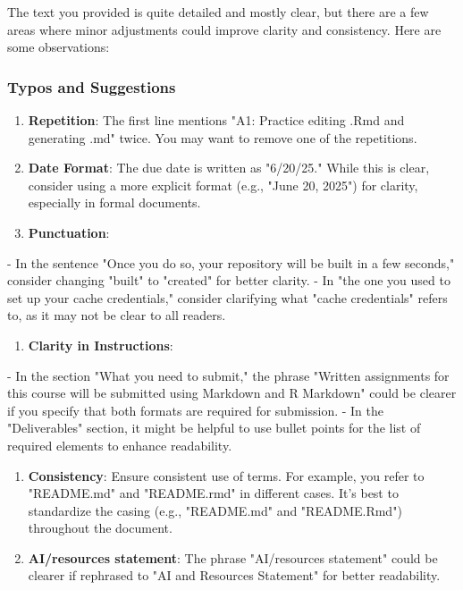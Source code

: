 \begin{botresponse}

The text you provided is quite detailed and mostly clear, but there are a few areas where minor adjustments could improve clarity and consistency. Here are some observations:

\subsubsection{Typos and Suggestions}

\begin{enumerate}
\item \textbf{Repetition}: The first line mentions "A1: Practice editing .Rmd and generating .md" twice. You may want to remove one of the repetitions.
\item \textbf{Date Format}: The due date is written as "6/20/25." While this is clear, consider using a more explicit format (e.g., "June 20, 2025") for clarity, especially in formal documents.
\item \textbf{Punctuation}:
\end{enumerate}

- In the sentence "Once you do so, your repository will be built in a few seconds," consider changing "built" to "created" for better clarity.
- In "the one you used to set up your cache credentials," consider clarifying what "cache credentials" refers to, as it may not be clear to all readers.

\begin{enumerate}
\item \textbf{Clarity in Instructions}:
\end{enumerate}

- In the section "What you need to submit," the phrase "Written assignments for this course will be submitted using Markdown and R Markdown" could be clearer if you specify that both formats are required for submission.
- In the "Deliverables" section, it might be helpful to use bullet points for the list of required elements to enhance readability.

\begin{enumerate}
\item \textbf{Consistency}: Ensure consistent use of terms. For example, you refer to "README.md" and "README.rmd" in different cases. It’s best to standardize the casing (e.g., "README.md" and "README.Rmd") throughout the document.
\item \textbf{AI/resources statement}: The phrase "AI/resources statement" could be clearer if rephrased to "AI and Resources Statement" for better readability.
\end{enumerate}


\end{botresponse}
